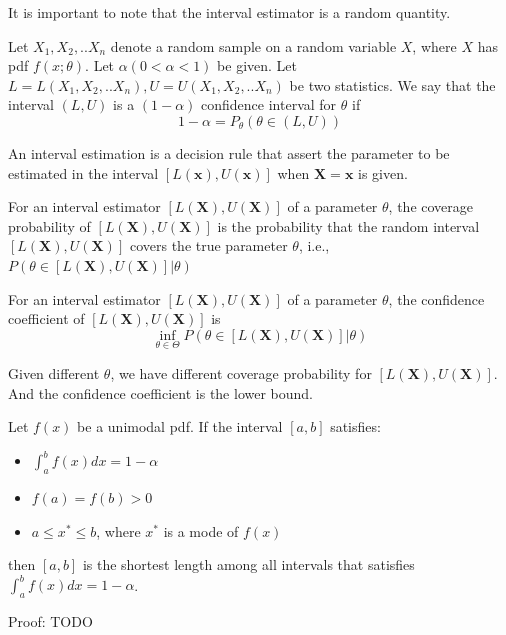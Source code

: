 \begin{refsection}
\begin{remark}
	It is important to note that the interval estimator is a random quantity.
\end{remark}

\begin{definition}
	Let $X_1,X_2,..X_n$ denote a random sample on a random variable $X$, where $X$ has pdf $f(x;\theta)$. Let $\alpha (0 < \alpha < 1)$ be given. Let $L=L(X_1,X_2,..X_n), U = U(X_1,X_2,..X_n)$ be two statistics. We say that the interval $(L,U)$ is a $(1-\alpha)$ confidence interval for $\theta$ if
	$$1-\alpha = P_{\theta}(\theta\in (L,U))$$
\end{definition}




\begin{definition}
	An interval estimation is a decision rule that assert the parameter to be estimated in the interval $[L(\bm{x}),U(\bm{x})]$ when $\bm{X}=\bm{x}$ is given. 
\end{definition}

\begin{definition}
	\cite[418]{casella2002statistical} For an interval estimator $[L(\bm{X}),U(\bm{X})]$ of a parameter $\theta$, the coverage probability of $[L(\bm{X}),U(\bm{X})]$ is the probability that the random interval $[L(\bm{X}),U(\bm{X})]$ covers the true parameter $\theta$, i.e., $P(\theta\in [L(\bm{X}),U(\bm{X})]|\theta)$
\end{definition}

\begin{definition}
	\cite[418]{casella2002statistical} For an interval estimator $[L(\bm{X}),U(\bm{X})]$ of a parameter $\theta$, the confidence coefficient of $[L(\bm{X}),U(\bm{X})]$ is
	$$\inf_{\theta\in\Theta} P(\theta\in [L(\bm{X}),U(\bm{X})]|\theta)$$
\end{definition}

\begin{remark}
	Given different $\theta$, we have different coverage probability for $[L(\bm{X}),U(\bm{X})]$. And the confidence coefficient is the lower bound. 
\end{remark}

\begin{theorem}
	\cite[441]{casella2002statistical} Let $f(x)$ be a unimodal pdf. If the interval $[a,b]$ satisfies:
	\begin{itemize}
		\item $\int_a^b f(x)dx = 1-\alpha$
		\item $f(a)=f(b) > 0$
		\item $a\leq x^* \leq b$, where $x^*$ is a mode of $f(x)$
	\end{itemize}
	then $[a,b]$ is the shortest length among all intervals that satisfies $\int_a^b f(x)dx = 1-\alpha$.
\end{theorem}
Proof: TODO


\end{refsection}
